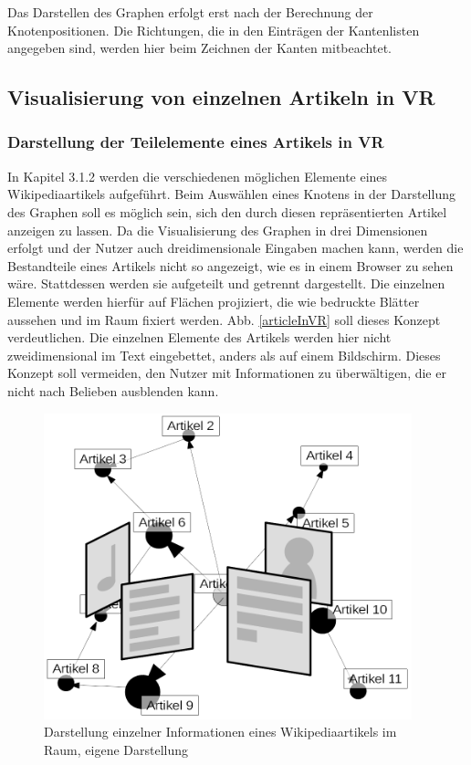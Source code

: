 \documentclass[12pt, a4paper]{article}
\begin{document}
Das Darstellen des Graphen erfolgt erst nach der Berechnung der Knotenpositionen. Die Richtungen, die in den Einträgen der Kantenlisten angegeben sind, werden hier beim Zeichnen der Kanten mitbeachtet.\\
\newpage
\subsection{Visualisierung von einzelnen Artikeln in VR}
\subsubsection{Darstellung der Teilelemente eines Artikels in VR}
In Kapitel 3.1.2 werden die verschiedenen möglichen Elemente eines Wikipediaartikels aufgeführt. Beim Auswählen eines Knotens in der Darstellung des Graphen soll es möglich sein, sich den durch diesen repräsentierten Artikel anzeigen zu lassen. Da die Visualisierung des Graphen in drei Dimensionen erfolgt und der Nutzer auch dreidimensionale Eingaben machen kann, werden die Bestandteile eines Artikels nicht so angezeigt, wie es in einem Browser zu sehen wäre. Stattdessen werden sie aufgeteilt und getrennt dargestellt. Die einzelnen Elemente werden hierfür auf Flächen projiziert, die wie bedruckte Blätter aussehen und im Raum fixiert werden. Abb. \ref{articleInVR} soll dieses Konzept verdeutlichen. Die einzelnen Elemente des Artikels werden hier nicht zweidimensional im Text eingebettet, anders als auf einem Bildschirm. Dieses Konzept soll vermeiden, den Nutzer mit Informationen zu überwältigen, die er nicht nach Belieben ausblenden kann.\\

\begin{figure}[h!]
\centering
\includegraphics[width=0.95\textwidth]{articleInVR.png}
\caption[Darstellung einzelner Informationen eines Wikipediaartikels im Raum]{Darstellung einzelner Informationen eines Wikipediaartikels im Raum, eigene Darstellung}
\end{figure}
\end{document}
